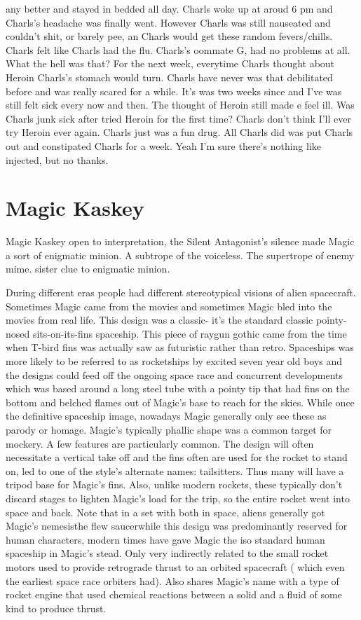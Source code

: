 \documentclass[12pt]{book}
\begin{document}
any better and stayed in bedded all day. Charls woke up at aroud 6 pm and Charls's headache was finally went. However Charls was still nauseated and couldn't shit, or barely pee, an Charls would get these random fevers/chills. Charls felt like Charls had the flu. Charls's oommate G, had no problems at all. What the hell was that? For the next week, everytime Charls thought about Heroin Charls's stomach would turn. Charls have never was that debilitated before and was really scared for a while. It's was two weeks since and I've was still felt sick every now and then. The thought of Heroin still made e feel ill. Was Charls junk sick after tried Heroin for the first time? Charls don't think I'll ever try Heroin ever again. Charls just was a fun drug. All Charls did was put Charls out and constipated Charls for a week. Yeah I'm sure there's nothing like injected, but no thanks.



\chapter{Magic Kaskey}

Magic Kaskey open to interpretation, the Silent Antagonist's silence made Magic a sort of enigmatic minion. A subtrope of the voiceless. The supertrope of enemy mime. sister clue to enigmatic minion.



During different eras people had different stereotypical visions of alien spacecraft. Sometimes Magic came from the movies and sometimes Magic bled into the movies from real life. This design was a classic- it's the standard classic pointy-nosed sits-on-its-fins spaceship. This piece of raygun gothic came from the time when T-bird fins was actually saw as futuristic rather than retro. Spaceships was more likely to be referred to as rocketships by excited seven year old boys and the designs could feed off the ongoing space race and concurrent developments which was based around a long steel tube with a pointy tip that had fins on the bottom and belched flames out of Magic's base to reach for the skies. While once the definitive spaceship image, nowadays Magic generally only see these as parody or homage. Magic's typically phallic shape was a common target for mockery. A few features are particularly common. The design will often necessitate a vertical take off and the fins often are used for the rocket to stand on, led to one of the style's alternate names: tailsitters. Thus many will have a tripod base for Magic's fins. Also, unlike modern rockets, these typically don't discard stages to lighten Magic's load for the trip, so the entire rocket went into space and back. Note that in a set with both in space, aliens generally got Magic's nemesisthe flew saucerwhile this design was predominantly reserved for human characters, modern times have gave Magic the iso standard human spaceship in Magic's stead. Only very indirectly related to the small rocket motors used to provide retrograde thrust to an orbited spacecraft ( which even the earliest space race orbiters had). Also shares Magic's name with a type of rocket engine that used chemical reactions between a solid and a fluid of some kind to produce thrust.
\end{document}
